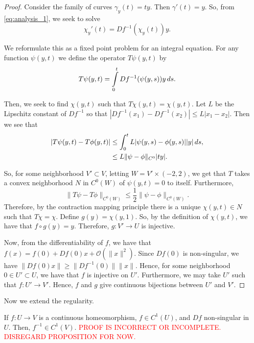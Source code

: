 \begin{proof}
Consider the family of curves $\gamma_y(t) = ty$. Then $\gamma'(t) = y$. So, from \eqref{eq:analysis_1}, we seek to solve
\begin{equation}
\chi_y'(t) = Df^{-1}(\chi_y(t)) y.
\end{equation}

We reformulate this as a fixed point problem for an integral equation. For any function $\psi(y,t)$ we define the operator $T \psi(y,t) $ by
\begin{equation}
T \psi(y,t) = \int\limits_0^t Df^{-1}(\psi(y,s)) y \, ds.
\end{equation}

Then, we seek to find $\chi(y,t)$ such that $T\chi(y,t) = \chi(y,t)$. Let $L$ be the Lipschitz constant of $Df^{-1}$ so that $|Df^{-1}(x_1) - Df^{-1}(x_2)| \leq L |x_1 - x_2|$. Then we see that
\begin{align}
|T\psi(y,t) - T\phi(y,t)| & \leq \int_0^t L|\psi(y,s) - \phi(y,s)| |y| \, ds,\\
& \leq L  \| \psi - \phi\|_{C^0} |ty|.
\end{align}

So, for some neighborhood $V' \subset V$, letting $W = V'\times(-2, 2)$, we get that $T$ takes a convex neighborhood $N$ in $C^0(W)$ of $\psi(y,t) = 0$ to itself. Furthermore, 
\begin{equation}
\|T\psi - T\phi\|_{C^0(W)} \leq \frac{1}{2} \|\psi - \phi\|_{C^0(W)}.
\end{equation}
Therefore, by the contraction mapping principle there is a unique $\chi(y,t) \in N$ such that $T\chi = \chi$. Define $g(y) = \chi(y,1)$. So, by the definition of $\chi(y,t)$, we have that $f\circ g(y) = y$. Therefore, $g: V' \to U$ is injective.

Now, from the differentiability of $f$, we have that $f(x) = f(0) + Df(0)x + \mathcal O(\|x\|^2)$. Since $Df(0)$ is non-singular, we have $\|Df(0)x\| \geq \|Df^{-1}(0)\| \|x\|$. Hence, for some neighborhood $0\in U'\subset U$, we have that $f$ is injective on $U'$. Furthermore, we may take $U'$ such that $f: U' \to V'$. Hence, $f$ and $g$ give continuous bijections between $U'$ and $V'$.
\end{proof}

Now we extend the regularity.

\begin{proposition}
If $f: U \to V$ is a continuous homeomorphism, $f\in C^1(U)$, and $Df$ non-singular in $U$. Then, $f^{-1}\in C^1(V)$.
\textcolor{red}{PROOF IS INCORRECT OR INCOMPLETE. DISREGARD PROPOSITION FOR NOW.}
\end{proposition}

